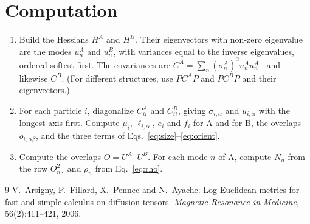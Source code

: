 \documentclass[11pt,a4paper]{article}
\begin{document}
\clearpage
\section{Computation}

\begin{enumerate}
\item Build the Hessians $H^A$ and $H^B$. Their eigenvectors with non-zero eigenvalue are the modes $u^A_n$ and $u^B_n$, with variances equal to the inverse eigenvalues, ordered softest first. The covariances are $C^A = \sum_n(\sigma^A_n)^2u^A_nu^{A\top}_n$ and likewise $C^B$. (For different structures, use $PC^AP$ and $PC^BP$ and their eigenvectors.)
\item For each particle $i$, diagonalize $C^A_{ii}$ and $C^B_{ii}$, giving $\sigma_{i,\alpha}$ and $u_{i,\alpha}$ with the longest axis first. Compute $\mu_i$, $\ell_{i,\alpha}$, $e_i$ and $f_i$ for A and for B, the overlaps $o_{i,\alpha\beta}$, and the three terms of Eqs.~\eqref{eq:size}--\eqref{eq:orient}.
\item Compute the overlaps $O = U^{A\top}U^B$. For each mode $n$ of A, compute $N_n$ from the row $O^2_{n\cdot}$ and $\rho_n$ from Eq.~\eqref{eq:rho}.
\end{enumerate}

\begin{thebibliography}{9}
 V.~Arsigny, P.~Fillard, X.~Pennec and N.~Ayache. Log-Euclidean metrics for fast and simple calculus on diffusion tensors. \emph{Magnetic Resonance in Medicine}, 56(2):411--421, 2006.
\end{thebibliography}
\end{document}
